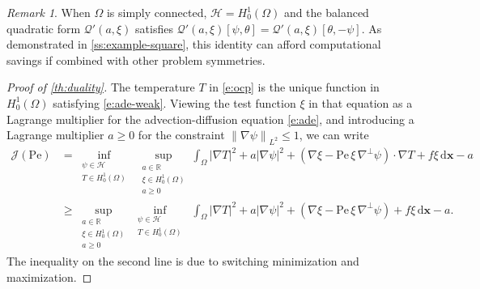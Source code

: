 \documentclass[a4paper, 10pt]{amsart}
\numberwithin{equation}{section}
\theoremstyle{plain}
\theoremstyle{definition}
\theoremstyle{remark}
\newtheorem{remark}{Remark}[section]
\newcommand{\cal}[1]{\mathcal{#1}}
\newcommand{\R}{\mathbb{R}}
\newcommand{\Pe}{\mathrm{Pe}}
\newcommand{\Hoz}{H_0^1(\Omega)}
\newcommand{\QF}{\mathcal{Q}}
\renewcommand{\vec}[1]{\mathbf{#1}}
\newcommand{\abs}[1]{\left\vert #1 \right\vert}
\newcommand{\dx}{\mathrm{d} \vec{x}}
\newcommand{\avg}[1]{\int_\Omega #1 \,\dx}
\newcommand{\norm}[1]{\left\| #1 \right\|}
\newcommand{\ocpval}{\mathcal{J}}
\begin{document}
\begin{remark}\label{rem:symmetrization-2}
    When $\Omega$ is simply connected, $\cal{H}=\Hoz$ and the balanced quadratic form $\QF'(a,\xi)$ satisfies $\mathcal{Q}'\left(a,\xi\right)[\psi,\theta] = \mathcal{Q}'\left(a,\xi\right)[\theta,-\psi]$. As demonstrated in \cref{ss:example-square}, this identity can afford computational savings if combined with other problem symmetries.
\end{remark}

\begin{proof}[Proof of \cref{th:duality}]
    The temperature $T$ in \cref{e:ocp} is the unique function in $H^1_0(\Omega)$ satisfying \cref{e:ade-weak}. Viewing the test function $\xi$ in that equation as a Lagrange multiplier for the advection-diffusion equation \cref{e:ade}, and introducing a Lagrange multiplier $a\geq 0$ for the constraint $\norm{\nabla\psi}_{L^2}\leq 1$, we can write
    \begin{align*}
        \ocpval(\Pe)
        &= 
        \inf_{\substack{
        \psi \in \cal{H} \\ 
        T \in H^1_0(\Omega)
        }}\;
        \sup_{\substack{a \in \R \\ \xi \in H^1_0(\Omega) \\ a\geq 0}}
        \avg{\abs{\nabla T}^2 + a |\nabla \psi|^2 + (\nabla\xi - \Pe\,\xi\,\nabla^\perp\psi )\cdot \nabla T + f\xi} - a
        \\
        &\geq 
        \sup_{\substack{a \in \R \\ \xi \in H^1_0(\Omega) \\ a\geq 0}}
        \inf_{\substack{
        \psi \in \cal{H} \\ 
        T \in H^1_0(\Omega)
        }}\;
        \avg{\abs{\nabla T}^2 + a |\nabla \psi|^2 + (\nabla\xi - \Pe\,\xi\,\nabla^\perp\psi ) + f\xi} - a.
    \end{align*}
    The inequality on the second line is due to switching minimization and maximization.


\end{proof}
\end{document}
